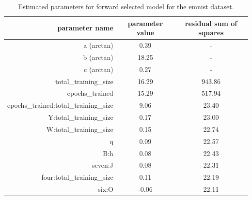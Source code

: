 \documentclass{article} %
\begin{document}
\begin{table}[h!]
    \centering
\begin{tabular}{r|c|c}

    parameter name &  parameter value &    residual sum of squares \\
    \hline
    a (arctan)                                  &         0.39 &    -    \\
    b (arctan)                                  &        18.25 &    -    \\
    c (arctan)                                  &         0.27 &    -    \\
    total\_training\_size                &        16.29 & 943.86 \\
    epochs\_trained                     &        15.29 & 517.94 \\
    epochs\_trained:total\_training\_size &         9.06 &  23.40 \\
    Y:total\_training\_size              &         0.17 &  23.00 \\
    W:total\_training\_size              &         0.15 &  22.74 \\
    q                                  &         0.09 &  22.57 \\
    B:h                                &         0.08 &  22.43 \\
    seven:J                            &         0.08 &  22.31 \\
    four:total\_training\_size           &         0.11 &  22.19 \\
    six:O                              &        -0.06 &  22.11 \\
    \end{tabular}
\caption{Estimated parameters for forward selected model for the emnist dataset.}
\label{table:param_values_emnist}
\end{table}
\end{document}
